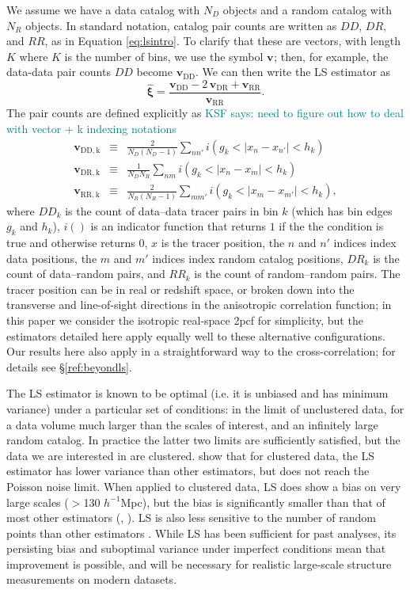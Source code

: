 \documentclass[modern]{aastex62}
\newcommand{\cf}{2pcf\xspace} %
\newcommand{\LS}{LS\xspace}
\newcommand{\hmpc}{$h^{-1}$Mpc}
\newcommand{\bld}[1]{\bm{#1}} %
\newcommand{\vv}[1]{\bld{v}_\mathrm{#1}}
\newcommand{\KSF}[1]{\textcolor{teal}{KSF says: #1}}
\begin{document}
We assume we have a data catalog with $N_D$ objects and a random catalog with $N_R$ objects.
In standard notation, catalog pair counts are written as $DD$, $DR$, and $RR$, as in Equation \ref{eq:lsintro}.
To clarify that these are vectors, with length $K$ where $K$ is the number of bins, we use the symbol $\vv{}$; then, for example, the data-data pair counts $DD$ become $\vv{DD}$.
We can then write the \LS estimator as 
\begin{equation} \label{eq:lsintro}
    \bld{\hat{\xi}} = \frac{\vv{DD} - 2\,\vv{DR} + \vv{RR}}{\vv{RR}}.
\end{equation}
The pair counts are defined explicitly as
\KSF{need to figure out how to deal with vector + k indexing notations}
\begin{eqnarray}\displaystyle
\label{eq:ls1}
\vv{DD,k} &\equiv& \frac{2}{N_D(N_D-1)} \sum_{n n'} i(g_k < |x_n - x_{n'}| < h_k) \\ 
\vv{DR,k} &\equiv& \frac{1}{N_D N_R} \sum_{n m} i(g_k < |x_n - x_m| < h_k) \\
\label{eq:ls3}
\vv{RR,k} &\equiv& \frac{2}{N_R(N_R-1)} \sum_{m m'} i(g_k < |x_m - x_{m'}| < h_k),
\end{eqnarray}
where $DD_k$ is the count of data--data tracer pairs in bin $k$ (which has bin edges $g_k$ and $h_k$), $i()$ is an indicator function that returns $1$ if the the condition is true and otherwise returns $0$, $x$ is the tracer position, the $n$ and $n'$ indices index data positions, the $m$ and $m'$ indices index random catalog positions, $DR_k$ is the count of data--random pairs, and $RR_k$ is the count of random--random pairs.
The tracer position can be in real or redshift space, or broken down into the transverse and line-of-sight directions in the anisotropic correlation function; in this paper we consider the isotropic real-space \cf for simplicity, but the estimators detailed here apply equally well to these alternative configurations.
Our results here also apply in a straightforward way to the cross-correlation; for details see \S\ref{ref:beyondls}. 

The \LS estimator is known to be optimal (i.e. it is unbiased and has minimum variance) under a particular set of conditions: in the limit of unclustered data, for a data volume much larger than the scales of interest, and an infinitely large random catalog. 
In practice the latter two limits are sufficiently satisfied, but the data we are interested in are clustered.
\cite{VargasMagana2013} show that for clustered data, the \LS estimator has lower variance than other estimators, but does not reach the Poisson noise limit.
When applied to clustered data, \LS does show a bias on very large scales ($>$130 \hmpc), but the bias is significantly smaller than that of most other estimators (\citealt{Kerscher1999}, \citealt{VargasMagana2013}).
\LS is also less sensitive to the number of random points than other estimators \citep{Kerscher2000}.
While \LS has been sufficient for past analyses, its persisting bias and suboptimal variance under imperfect conditions mean that improvement is possible, and will be necessary for realistic large-scale structure measurements on modern datasets.
\end{document}
